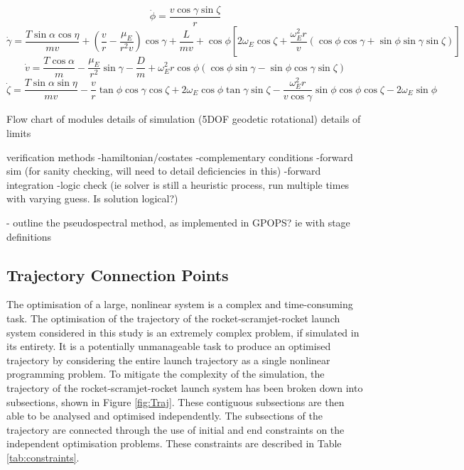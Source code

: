 \begin{equation}
\dot{\phi} = \frac{v\cos\gamma\sin\zeta}{r}
\end{equation}
\begin{equation}
\dot{\gamma} = \frac{T\sin\alpha \cos\eta}{mv} + (\frac{v}{r}-\frac{\mu_E}{r^2 v})\cos\gamma + \frac{L}{mv}
+ \cos\phi[2\omega_E \cos\zeta + \frac{\omega_E^2 r}{v}(\cos\phi\cos\gamma+\sin\phi\sin\gamma\sin\zeta)]
\end{equation}
\begin{equation}
\dot{v} = \frac{T\cos\alpha}{m}-\frac{\mu_E}{r^2}\sin\gamma - \frac{D}{m}
+ \omega_E^2 r\cos\phi(\cos\phi\sin\gamma-\sin\phi\cos\gamma\sin\zeta)
\end{equation}
\begin{equation}
\dot{\zeta} = \frac{T\sin\alpha \sin\eta}{mv}-\frac{v}{r}\tan\phi\cos\gamma\cos\zeta +2\omega_E\cos\phi\tan\gamma\sin\zeta - \frac{\omega_E^2 r}{v\cos\gamma}\sin\phi\cos\phi\cos\zeta-2\omega_E\sin\phi 
\end{equation}



	Flow chart of modules
	details of simulation (5DOF geodetic rotational)
	details of limits
	
	verification methods
	-hamiltonian/costates
	-complementary conditions
	-forward sim (for sanity checking, will need to detail deficiencies in this)
	-forward integration
	-logic check (ie solver is still a heuristic process, run multiple times with varying guess. Is solution logical?)



- outline the pseudospectral method, as implemented in GPOPS? ie with stage definitions

\subsection{Trajectory Connection Points}

The optimisation of a large, nonlinear system is a complex and time-consuming task. The optimisation of the trajectory of the rocket-scramjet-rocket launch system considered in this study is an extremely complex problem, if simulated in its entirety. It is a potentially unmanageable task to produce an optimised trajectory by considering the entire launch trajectory as a single nonlinear programming problem. 
To mitigate the complexity of the simulation, the trajectory of the rocket-scramjet-rocket launch system has been broken down into subsections, shown in Figure \ref{fig:Traj}. These contiguous subsections are then able to be analysed and optimised independently. The subsections of the trajectory are connected through the use of initial and end constraints on the independent optimisation problems. These constraints are described in Table \ref{tab:constraints}.

